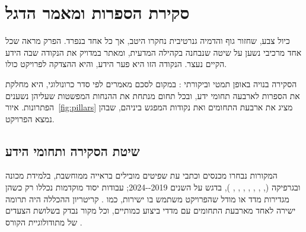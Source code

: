 \chapter{סקירת הספרות ומאמר הדגל}
\label{ch:lit}

\begin{managerbox}
כיול צבע, שחזור גוף והדמיה גנרטיבית נחקרו היטב, אך כל אחד בנפרד. הפרק מראה שכל אחד מרכיבי  נשען על שיטה שנבחנה בקהילה המדעית, ומאתר במדויק את הנקודה שבה הידע הקיים נעצר. הנקודה הזו היא פער הידע, והיא ההצדקה לפרויקט כולו.
\end{managerbox}

הסקירה בנויה באופן תמטי וביקורתי \cite{webster2002literature}: במקום לסכם מאמרים לפי סדר כרונולוגי, היא מחלקת את הספרות לארבעה תחומי ידע, ובכל תחום מנתחת את ההנחות המפשטות שעליהן נשענים הפתרונות. איור~\ref{fig:pillars} מציג את ארבעת התחומים ואת נקודות המפגש ביניהם, שבהן נמצא הפרויקט.

\section{שיטת הסקירה ותחומי הידע}
\label{sec:lit-method}

המקורות נבחרו מכנסים וכתבי עת שפיטים מובילים בראייה ממוחשבת, בלמידת מכונה ובגרפיקה (, , , , , , , ), בדגש על השנים \num{2019--2024}; עבודות יסוד מוקדמות נכללו רק כשהן מגדירות מדד או מודל שהפרויקט משתמש בו ישירות, כמו  \cite{sharma2005ciede2000}. קריטריון ההכללה היה תרומה ישירה לאחד מארבעת התחומים עם מדדי ביצוע כמותיים, וכל מקור נבדק בשלושת הצעדים של מתודולוגיית הקורס \cite{segal2026booklet}.

